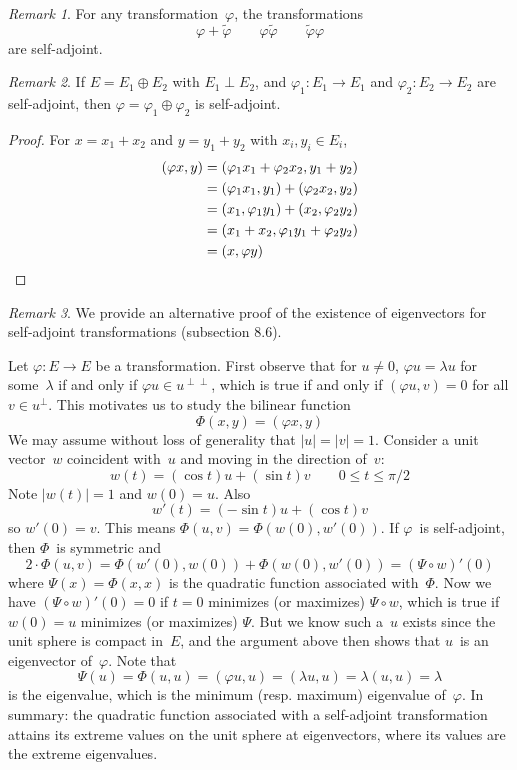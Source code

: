 \documentclass[letterpaper,12pt]{article}
\newcommand{\orth}{\perp}
\newcommand{\after}{\circ}
\newcommand{\dsum}{\oplus}
\newcommand{\mult}{\cdot}
\newcommand{\oc}[1]{#1^{\perp}}
\newcommand{\occ}[1]{#1^{\perp\perp}}
\newcommand{\iprod}[2]{(#1,#2)}
\newcommand{\norm}[1]{|#1|}
\newcommand{\adj}[1]{\widetilde{#1}}
\theoremstyle{definition}
\theoremstyle{remark}
\newtheorem*{rmk}{Remark}
\begin{document}
\begin{rmk}
For any transformation~\(\varphi\), the transformations
\[\varphi+\adj{\varphi}\qquad\varphi\adj{\varphi}\qquad\adj{\varphi}\varphi\]
are self-adjoint.
\end{rmk}

\begin{rmk}
If \(E=E_1\dsum E_2\) with \(E_1\orth E_2\), and \(\varphi_1:E_1\to E_1\) and \(\varphi_2:E_2\to E_2\) are self-adjoint, then \(\varphi=\varphi_1\dsum\varphi_2\) is self-adjoint.
\end{rmk}
\begin{proof}
For \(x=x_1+x_2\) and \(y=y_1+y_2\) with \(x_i,y_i\in E_i\),
\begin{align*}
\iprod{\varphi x}{y}&=\iprod{\varphi_1 x_1+\varphi_2 x_2}{y_1+y_2}\\
	&=\iprod{\varphi_1 x_1}{y_1}+\iprod{\varphi_2 x_2}{y_2}\\
	&=\iprod{x_1}{\varphi_1 y_1}+\iprod{x_2}{\varphi_2 y_2}\\
	&=\iprod{x_1+x_2}{\varphi_1 y_1+\varphi_2 y_2}\\
	&=\iprod{x}{\varphi y}\qedhere
\end{align*}
\end{proof}

\begin{rmk}
We provide an alternative proof of the existence of eigenvectors for self-adjoint transformations (subsection 8.6).

Let \(\varphi:E\to E\) be a transformation. First observe that for \(u\ne 0\), \(\varphi u=\lambda u\) for some~\(\lambda\) if and only if \(\varphi u\in\occ{u}\), which is true if and only if \(\iprod{\varphi u}{v}=0\) for all \(v\in\oc{u}\). This motivates us to study the bilinear function
\[\Phi(x,y)=\iprod{\varphi x}{y}\]
We may assume without loss of generality that \(\norm{u}=\norm{v}=1\). Consider a unit vector~\(w\) coincident with~\(u\) and moving in the direction of~\(v\):
\[w(t)=(\cos t)u+(\sin t)v\qquad 0\le t\le\pi/2\]
Note \(\norm{w(t)}=1\) and \(w(0)=u\). Also
\[w'(t)=(-\sin t)u+(\cos t)v\]
so \(w'(0)=v\). This means \(\Phi(u,v)=\Phi(w(0),w'(0))\). If \(\varphi\)~is self-adjoint, then \(\Phi\)~is symmetric and
\[2\mult\Phi(u,v)=\Phi(w'(0),w(0))+\Phi(w(0),w'(0))=(\Psi\after w)'(0)\]
where \(\Psi(x)=\Phi(x,x)\) is the quadratic function associated with~\(\Phi\). Now we have \((\Psi\after w)'(0)=0\) if \(t=0\) minimizes (or maximizes) \(\Psi\after w\), which is true if \(w(0)=u\) minimizes (or maximizes) \(\Psi\). But we know such a~\(u\) exists since the unit sphere is compact in~\(E\), and the argument above then shows that \(u\)~is an eigenvector of~\(\varphi\). Note that
\[\Psi(u)=\Phi(u,u)=\iprod{\varphi u}{u}=\iprod{\lambda u}{u}=\lambda\iprod{u}{u}=\lambda\]
is the eigenvalue, which is the minimum (resp. maximum) eigenvalue of~\(\varphi\). In summary: the quadratic function associated with a self-adjoint transformation attains its extreme values on the unit sphere at eigenvectors, where its values are the extreme eigenvalues.
\end{rmk}
\end{document}
